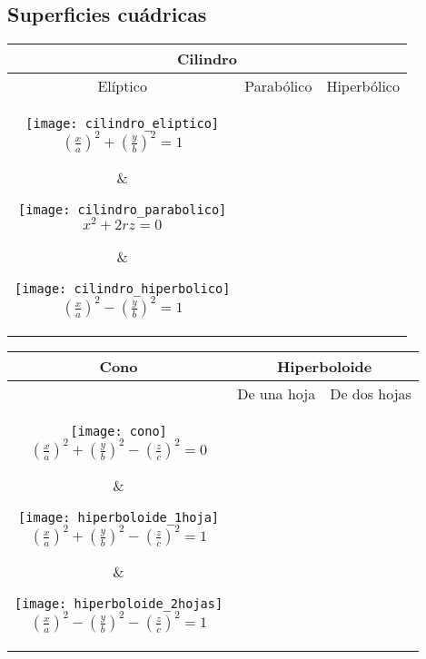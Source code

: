 \documentclass[a4paper, twoside]{article}
\numberwithin{equation}{section}
\numberwithin{figure}{section}
\numberwithin{table}{section}
\begin{document}
\subsection{Superficies cuádricas}
\begin{center}
	\begin{tabular}{c c c}
		\multicolumn{3}{c}{\textbf{Cilindro}} \\
		\toprule
		Elíptico & Parabólico & Hiperbólico \\
		\parbox{5cm}{
			\begin{center}
				\texttt{[image: cilindro\_eliptico]} \\
				$\left(\frac{x}{a}\right)^2+\left(\frac{y}{b}\right)^2=1$
			\end{center}} &
		\parbox{5cm}{
			\begin{center}
				\texttt{[image: cilindro\_parabolico]} \\
				$x^2+2rz=0$
			\end{center}} &
		\parbox{5cm}{
			\begin{center}
				\texttt{[image: cilindro\_hiperbolico]} \\
				$\left(\frac{x}{a}\right)^2-\left(\frac{y}{b}\right)^2=1$
			\end{center}} \\
	\end{tabular}

	\begin{tabular}{c | c c}
		\textbf{Cono} & \multicolumn{2}{c}{\textbf{Hiperboloide}} \\
		\hline
		 & De una hoja & De dos hojas \\
		\parbox{5cm}{
			\begin{center}
				\texttt{[image: cono]} \\
				$\left(\frac{x}{a}\right)^2+\left(\frac{y}{b}\right)^2-\left(\frac{z}{c}\right)^2=0$
			\end{center}} &
		\parbox{5cm}{
			\begin{center}
				\texttt{[image: hiperboloide\_1hoja]} \\
				$\left(\frac{x}{a}\right)^2+\left(\frac{y}{b}\right)^2-\left(\frac{z}{c}\right)^2=1$
			\end{center}} &
		\parbox{5cm}{
			\begin{center}
				\texttt{[image: hiperboloide\_2hojas]} \\
				$\left(\frac{x}{a}\right)^2-\left(\frac{y}{b}\right)^2-\left(\frac{z}{c}\right)^2=1$
			\end{center}} \\
	\end{tabular}


\end{center}
\end{document}
